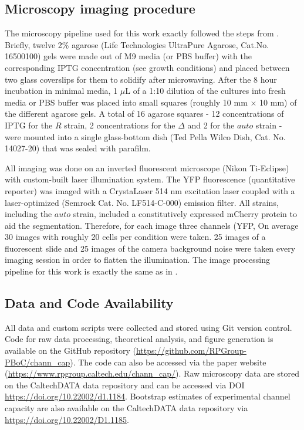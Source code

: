 \subsection{Microscopy imaging procedure}

The microscopy pipeline used for this work exactly followed the steps from
\cite{Razo-Mejia2018}. Briefly, twelve 2\% agarose (Life Technologies UltraPure
Agarose, Cat.No. 16500100) gels were made out of M9 media (or PBS buffer) with
the corresponding IPTG concentration (see growth conditions) and placed between
two glass coverslips for them to solidify after microwaving. After the 8 hour
incubation in minimal media, 1 $\mu$L of a 1:10 dilution of the cultures into
fresh media or PBS buffer was placed into small squares (roughly 10 mm $\times$
10 mm) of the different agarose gels. A total of 16 agarose squares - 12
concentrations of IPTG for the $R$ strain, 2 concentrations for the $\Delta$ and
2 for the $auto$ strain - were mounted into a single glass-bottom dish (Ted
Pella Wilco Dish, Cat. No. 14027-20) that was sealed with parafilm.

All imaging was done on an inverted fluorescent microscope (Nikon Ti-Eclipse)
with custom-built laser illumination system. The YFP fluorescence (quantitative
reporter) was imaged with a CrystaLaser 514 nm excitation laser coupled with a
laser-optimized (Semrock Cat. No. LF514-C-000) emission filter. All strains,
including the $auto$ strain, included a constitutively expressed mCherry protein
to aid the segmentation. Therefore, for each image three channels (YFP, On
average 30 images with roughly 20 cells per condition were taken. 25 images of a
fluorescent slide and 25 images of the camera background noise were taken every
imaging session in order to flatten the illumination. The image processing
pipeline for this work is exactly the same as in \cite{Razo-Mejia2018}.

\subsection{Data and Code Availability}

All data and custom scripts were collected and stored using Git version
control. Code for raw data processing, theoretical analysis, and figure
generation is available on the GitHub repository
(\url{https://github.com/RPGroup-PBoC/chann_cap}). The code can also be
accessed via the paper website
(\url{https://www.rpgroup.caltech.edu/chann_cap/}). Raw microscopy data are
stored on the CaltechDATA data repository and can be accessed via DOI
\url{https://doi.org/10.22002/d1.1184}. Bootstrap estimates of experimental
channel capacity are also available on the CaltechDATA data repository via
\url{https://doi.org/10.22002/D1.1185}.
